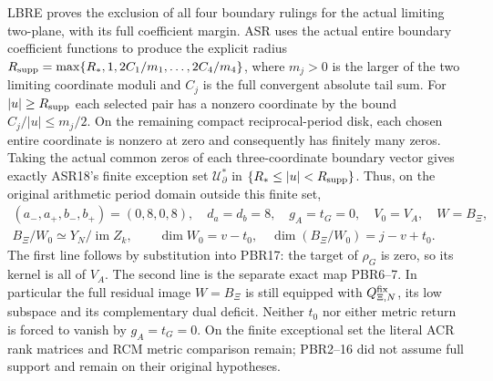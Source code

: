 \documentclass[11pt,a4paper]{article}
\begin{document}
LBRE proves the exclusion of all four boundary rulings for the
actual limiting two-plane, with its full coefficient margin.
ASR uses the actual entire boundary coefficient functions to
produce the explicit radius
$R_{\rm supp}=\max\{R_*,1,2C_1/m_1,\ldots,2C_4/m_4\}$,
where $m_j>0$ is the larger of the two limiting coordinate
moduli and $C_j$ is the full convergent absolute tail sum.
For $|u|\ge R_{\rm supp}$ each selected pair has a nonzero
coordinate by the bound $C_j/|u|\le m_j/2$.
On the remaining compact reciprocal-period disk, each chosen
entire coordinate is nonzero at zero and consequently has
finitely many zeros. Taking the actual common zeros of each
three-coordinate boundary vector gives exactly ASR18's finite
exception set $\mathcal U_{\partial}^*$ in
$\{R_*\le|u|<R_{\rm supp}\}$. Thus, on the original arithmetic
period domain outside this finite set,
\[
\begin{gathered}
 (a_-,a_+,b_-,b_+)=(0,8,0,8),\quad
 d_a=d_b=8,\quad g_A=t_G=0,\quad V_0=V_A,\quad W=B_\Xi,\\
 B_\Xi/W_0\simeq Y_N/\operatorname{im}Z_k,\qquad
 \dim W_0=v-t_0,\quad\dim(B_\Xi/W_0)=j-v+t_0 .
\end{gathered}\tag{PBR18}
\]
The first line follows by substitution into PBR17: the target
of $\rho_G$ is zero, so its kernel is all of $V_A$.
The second line is the separate exact map PBR6--7. In particular
the full residual image $W=B_\Xi$ is still equipped with
$Q_{\Xi,N}^{\rm fix}$, its low subspace and its complementary
dual deficit. Neither $t_0$ nor either metric return is forced
to vanish by $g_A=t_G=0$. On the finite exceptional set the
literal ACR rank matrices and RCM metric comparison remain;
PBR2--16 did not assume full support and remain on their
original hypotheses.
\end{document}
